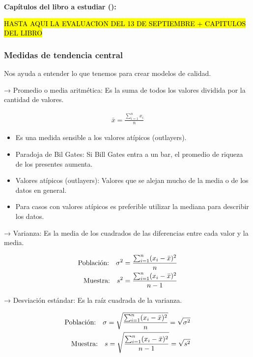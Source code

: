 \documentclass{templateNote}
\begin{document}
\textbf{Capítulos del libro a estudiar ():}  

\hl{HASTA AQUI LA EVALUACION DEL 13 DE SEPTIEMBRE + CAPITULOS DEL LIBRO}

\subsubsection*{Medidas de tendencia central}

Nos ayuda a entender lo que tenemos para crear modelos de calidad.

→ Promedio o media aritmética: Es la suma de todos los valores dividida por la cantidad de valores.

\begin{align*}
    \bar{x} = \frac{\sum_{i=1}^{n} x_i}{n}
\end{align*}

\begin{itemize}
    \item Es una medida sensible a los valores atípicos (outlayers).
    \item Paradoja de Bil Gates: Si Bill Gates entra a un bar, el promedio de riqueza de los presentes aumenta. 
    \item Valores atípicos (outlayers): Valores que se alejan mucho de la media o de los datos en general.
    \item Para casos con valores atípicos es preferible utilizar la mediana para describir los datos.
\end{itemize}

→ Varianza: Es la media de los cuadrados de las diferencias entre cada valor y la media.

\begin{align*}
    \textnormal{Población:} \quad \sigma^2 = \frac{\sum_{i=1}^{n} (x_i - \bar{x})^2}{n} \\
    \textnormal{Muestra:} \quad s^2 = \frac{\sum_{i=1}^{n} (x_i - \bar{x})^2}{n-1}
\end{align*}

→ Desviación estándar: Es la raíz cuadrada de la varianza.

\begin{align*}
    \textnormal{Población:} \quad \sigma = \sqrt{\frac{\sum_{i=1}^{n} (x_i - \bar{x})^2}{n}} = \sqrt{{\sigma}^2} \\
    \textnormal{Muestra:} \quad s = \sqrt{\frac{\sum_{i=1}^{n} (x_i - \bar{x})^2}{n-1}} = \sqrt{{s}^2}
\end{align*}
\end{document}
